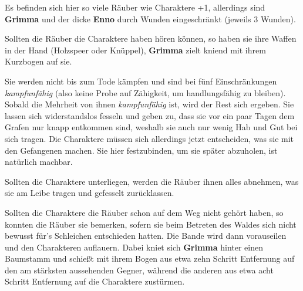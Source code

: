 Es befinden sich hier so viele Räuber wie Charaktere +1, allerdings sind \textbf{Grimma} und der dicke \textbf{Enno} durch Wunden eingeschränkt (jeweils 3 Wunden).


Sollten die Räuber die Charaktere haben hören können, so haben sie ihre Waffen in der Hand (Holzspeer oder Knüppel), \textbf{Grimma} zielt kniend mit ihrem Kurzbogen auf sie.

\kreaturraeuber

Sie werden nicht bis zum Tode kämpfen und sind bei fünf Einschränkungen \textit{kampfunfähig} (also keine Probe auf Zähigkeit, um handlungsfähig zu bleiben). Sobald die Mehrheit von ihnen \textit{kampfunfähig} ist, wird der Rest sich ergeben. Sie lassen sich widerstandslos fesseln und geben zu, dass sie vor ein paar Tagen dem Grafen nur knapp entkommen sind, weshalb sie auch nur wenig Hab und Gut bei sich tragen.
Die Charaktere müssen sich allerdings jetzt entscheiden, was sie mit den Gefangenen machen. Sie hier festzubinden, um sie später abzuholen, ist natürlich machbar.

Sollten die Charaktere unterliegen, werden die Räuber ihnen alles abnehmen, was sie am Leibe tragen und gefesselt zurücklassen. 


Sollten die Charaktere die Räuber schon auf dem Weg nicht gehört haben, so konnten die Räuber sie bemerken, sofern sie beim Betreten des Waldes sich nicht bewusst für's Schleichen entschieden hatten. Die Bande wird dann vorauseilen und den Charakteren auflauern. Dabei kniet sich \textbf{Grimma} hinter einen Baumstamm und schießt mit ihrem Bogen aus etwa zehn Schritt Entfernung auf den am stärksten aussehenden Gegner, während die anderen aus etwa acht Schritt Entfernung auf die Charaktere zustürmen. 



